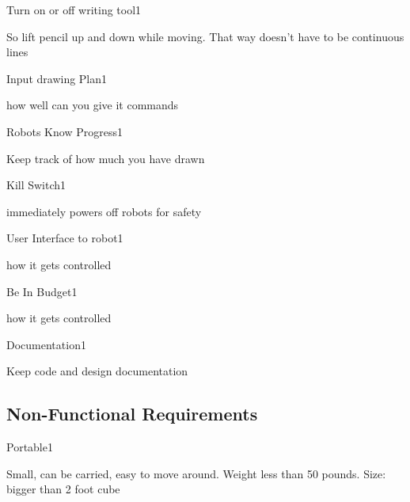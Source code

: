 \begin{functional_requirement}{Turn on or off writing tool}{1}
\item So lift pencil up and down while moving. That way doesn't have to be continuous lines
\end{functional_requirement}

\begin{functional_requirement}{Input drawing Plan}{1}
\item how well can you give it commands
\end{functional_requirement}

\begin{functional_requirement}{Robots Know Progress}{1}
\item Keep track of how much you have drawn
\end{functional_requirement}

\begin{functional_requirement}{Kill Switch}{1}
\item immediately powers off robots for safety
\end{functional_requirement}

\begin{functional_requirement}{User Interface to robot}{1}
\item how it gets controlled
\end{functional_requirement}

\begin{functional_requirement}{Be In Budget}{1}
\item how it gets controlled
\end{functional_requirement}

\begin{functional_requirement}{Documentation}{1}
\item Keep code and design documentation
\end{functional_requirement}


\subsection{Non-Functional Requirements}

\begin{nonfunctional_requirement}{Portable}{1}
\item Small, can be carried, easy to move around. Weight less than 50 pounds. Size: bigger than 2 foot cube
\end{nonfunctional_requirement}

